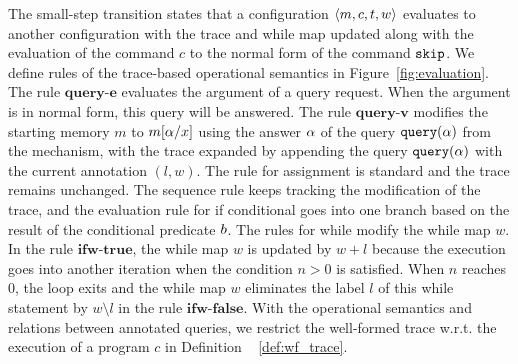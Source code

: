 \documentclass[a4paper,11pt]{article}
\begin{document}
%
The small-step transition states that a configuration $\langle m, c, t,w \rangle$ evaluates to another configuration with the trace and while map updated along with the evaluation of the command $c$ to the normal form of the command $\mathtt{skip}$.  
We define rules of the trace-based operational semantics in Figure~\ref{fig:evaluation}.
%
%
The rule $\textbf{query-e}$ evaluates the argument of a query request. When the argument is in normal form, this query will be answered.
%
The rule $\textbf{query-v}$ modifies the starting memory $m$ to $m[\alpha/x]$ using the answer $\alpha$ of the query ${\tt query}(\alpha)$ from the mechanism, 
with the trace expanded by appending the query ${\tt query}(\alpha)$ with the current annotation $(l,w)$. 
%
The rule for assignment is standard and the trace remains unchanged.%
The sequence rule keeps tracking the modification of the trace, and the evaluation rule for if conditional goes into one branch based on the result of the conditional predicate $b$. 
%
The rules for while modify the while map $w$. 
In the rule $\textbf{ifw-true}$, the while map $w$ is updated by $w + l$ because the execution goes into another iteration when the condition $n >0$ is satisfied. 
%
When $n$ reaches $0$, the loop exits and the while map $w$ eliminates the label $l$ of this while statement by $w \setminus l$ in the rule $\textbf{ifw-false}$.  
With the operational semantics and relations between annotated queries, we restrict the well-formed trace w.r.t. the execution of a program $c$ in Definition ~ \ref{def:wf_trace}.
%
\end{document}
